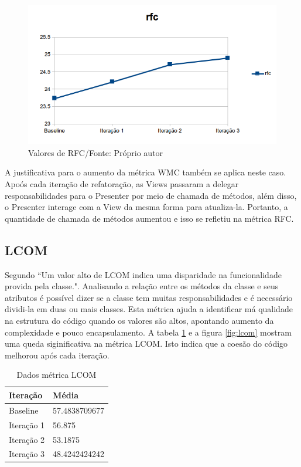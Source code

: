 \begin{figure}[h]
	\centering
	\includegraphics{img/rfc.png}
	\caption{Valores de RFC/Fonte: Próprio autor}
	\label{fig:rfc}
\end{figure}

A justificativa para o aumento da métrica WMC também se aplica neste caso.
Apoós cada iteração de refatoração, as Views passaram a delegar
responsabilidades para o Presenter por meio de chamada de métodos, além disso, o Presenter interage com a
View da mesma forma para atualiza-la. Portanto, a quantidade de chamada de
métodos aumentou e isso se refletiu na métrica RFC.

\subsection{LCOM}

Segundo  ``Um valor alto de LCOM indica uma disparidade na
funcionalidade provida pela classe.". Analisando a relação entre os métodos da
classe e seus atributos é possível dizer se a classe tem muitas
responsabilidades e é necessário dividi-la em duas ou mais classes. Esta métrica
ajuda a identificar má qualidade na estrutura do código quando os valores são
altos, apontando aumento da complexidade e pouco encapsulamento. A tabela
\ref{tab:lcom} e a figura \ref{fig:lcom} mostram uma queda siginificativa na
métrica LCOM. Isto indica que a coesão do código melhorou após cada iteração.

\begin{table}[h]
	\centering
	    \caption{Dados métrica LCOM}
    \begin{tabular}{ | l | l | }
    \hline
    Iteração & Média 			\\ \hline
    Baseline & 57.4838709677   	\\ \hline
    Iteração 1 & 56.875			\\ \hline
	Iteração 2 & 53.1875		\\ \hline
	Iteração 3 & 48.4242424242	\\ \hline
    \end{tabular}
    \label{tab:lcom}
\end{table}

